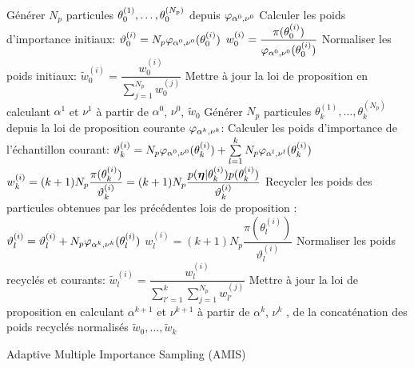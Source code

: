 \begin{algorithm}[p!]
	\begin{algorithmic}
	
	
	
	\State Générer $N_p$ particules ${\theta}_0^{(1)}, \dots, {\theta}_0^{(N_p)}$ depuis  ${\varphi}_{\alpha^0, \nu^0}$
		\State Calculer les poids d'importance initiaux:
		\State $\vartheta_0^{(i)} = N_p {\varphi}_{\alpha^0, \nu^0}({\theta}_0^{(i)})$
		\State $w_0^{(i)} = \dfrac{\pi(\theta_0^{(i)})}{{\varphi}_{\alpha^0, \nu^0}(\theta_0^{(i)})}$
	\EndFor
	\State Normaliser les poids initiaux:
		\State $\tilde{w}_0^{(i)} = \dfrac{w_0^{(i)}}{\sum\limits_{j=1}^{N_p}w_0^{(j)}}$
	\EndFor
	\State Mettre à jour la loi de proposition en calculant $\alpha^1$ et $\nu^1$ à partir de $\alpha^0$, $\nu^0$, $\tilde{w}_0$ 
		\State Générer $N_p$ particules $\theta_k^{(1)}, \dots, \theta_k^{(N_p)}$ depuis la loi de proposition courante ${\varphi}_{\alpha^k, \nu^k}$:
			\State Calculer les poids d'importance de l'échantillon courant:
			\State $\vartheta_k^{(i)} = N_p {\varphi}_{\alpha^0, \nu^0}(\theta_k^{(i)}) + \sum\limits_{l=1}^k N_p {\varphi}_{\alpha^l, \nu^l}(\theta_k^{(i)})$
			\State $w_k^{(i)} = (k+1)N_p \dfrac{\pi(\theta_k^{(i)})}{\vartheta_k^{(i)}} = (k+1)N_p \dfrac{p({\bm{\eta}} | \theta_k^{(i)})p(\theta_k^{(i)})}{\vartheta_k^{(i)}}$
			\EndFor
		\State Recycler les poids des particules obtenues par les précédentes lois de proposition :
				\State $\vartheta_l^{(i)} = \vartheta_l^{(i)} + N_p {\varphi}_{\alpha^k, \nu^k}(\theta_l^{(i)})$
				\State $w_l^{(i)} = (k+1) N_p \dfrac{\pi(\theta_l^{(i)})}{\vartheta_l^{(i)}}$
				\EndFor
			\EndFor
		\State Normaliser les poids recyclés et courants:
				\State $\tilde{w}_l^{(i)} = \dfrac{w_l^{(i)}}{\sum\limits_{l'=1}^k\sum\limits_{j=1}^{N_p} w_{l'}^{(j)}}$
				\EndFor
			\EndFor
		\State Mettre à jour la loi de proposition en calculant $\alpha^{k+1}$ et $\nu^{k+1}$ à partir de $\alpha^k$, $\nu^k$ , de la concaténation des poids recyclés normalisés $\tilde{w}_0, \dots, \tilde{w}_k$ 
		\EndFor
	
	\end{algorithmic}
	\caption{Adaptive Multiple Importance Sampling (AMIS)}
	\label{algo_AMIS}
\end{algorithm}

